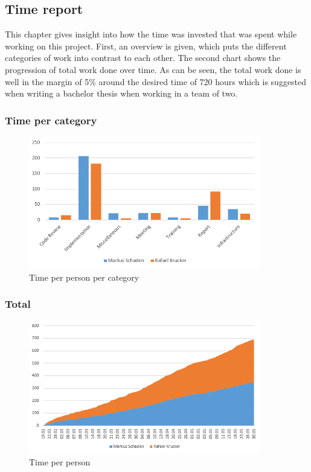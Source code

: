\subsection{Time report}
This chapter gives insight into how the time was invested that was spent while working on this project. First, an overview is given, which puts the different categories of work into contrast to each other. The second chart shows the progression of total work done over time. As can be seen, the total work done is well in the margin of 5\% around the desired time of 720 hours which is suggested when writing a bachelor thesis when working in a team of two. 
\subsubsection{Time per category}
\begin{figure}[H]
	\centering
	\includegraphics[width=0.9\textwidth]{img/timereport_epics}
	\caption{Time per person per category}
	\label{fig:timereport_epics}
\end{figure}

\subsubsection{Total}
\begin{figure}[H]
	\centering
	\includegraphics[width=0.9\textwidth]{img/timereport_total}
	\caption{Time per person}
	\label{fig:timereport_total}
\end{figure}
